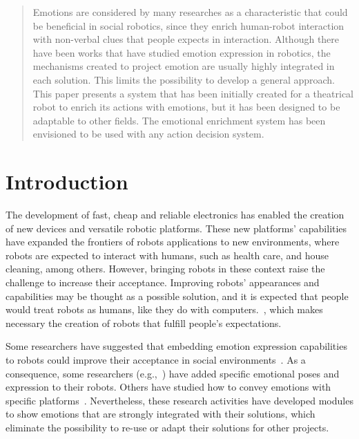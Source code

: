 \documentclass{sig-alternate-05-2015}
\begin{document}
\maketitle
\begin{abstract}
Emotions are considered by many researches as a characteristic that could be beneficial in social robotics, since they enrich human-robot interaction with non-verbal clues that people expects in interaction. Although there have been works that have studied emotion expression in robotics, the mechanisms created to project emotion are usually highly integrated in each solution. This limits the possibility to develop a general approach. 
This paper presents a system that has been initially created for a theatrical robot to enrich its actions with emotions, but it has been designed to be adaptable to other fields. The emotional enrichment system has been envisioned to be used with any action decision system. 
\end{abstract}

\printccsdesc



\section{Introduction}
The development of fast, cheap and reliable electronics has enabled the creation of new devices and versatile robotic platforms. These new platforms' capabilities have expanded the frontiers of robots applications to new environments, where robots are expected to interact with humans, such as health care, and house cleaning, among others. However, bringing robots in these context raise the challenge to increase their acceptance. Improving robots' appearances and capabilities may be thought as a possible solution, and it is expected that people would treat robots as humans, like they do with computers.~\cite{Reeves1996}, which makes necessary the creation of robots that fulfill people's expectations.

Some researchers have suggested that embedding emotion expression capabilities to robots could improve their acceptance in social environments~\cite{Pavia2014}. As a consequence, some researchers (e.g.,~\cite{Breazeal2002}) have added specific emotional poses and expression to their robots. Others have studied how to convey emotions with specific platforms~\cite{Li2011,Brown2014}. Nevertheless, these research activities have developed modules to show emotions that are strongly integrated with their solutions, which eliminate the possibility to re-use or adapt their solutions for other projects. 
 
\end{document}

